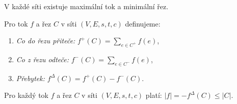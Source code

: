 \begin{t_fact}
  V každé síti existuje maximální tok a minimální řez.
\end{t_fact}

\begin{t_definition}
  Pro tok $f$ a řez $C$ v síti $(V, E, s, t, c)$ definujeme:
  \begin{enumerate}
    \item \textit{Co do řezu přiteče:} $f^+(C)=\sum_{e\in C^+} f(e)$,
    \item \textit{Co z řezu odteče:} $f^-(C)=\sum_{e\in C^-} f(e)$,
    \item \textit{Přebytek:} $f^\Delta(C)=f^+(C)-f^-(C)$.
  \end{enumerate}
\end{t_definition}

\begin{t_lemma}
  Pro každý tok $f$ a řez $C$ v síti $(V, E, s, t, c)$ platí: $|f|=-f^\Delta(C)\leq|C|$.
\end{t_lemma}


